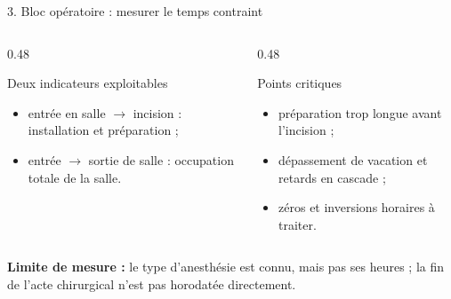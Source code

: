 \begin{frame}{3. Bloc opératoire : mesurer le temps contraint}
  \begin{center}
  \end{center}

  \vspace{0.2em}
  \begin{columns}[T]
    \begin{column}{0.48\textwidth}
      \begin{exampleblock}{Deux indicateurs exploitables}
        \footnotesize
        \begin{itemize}\itemsep1pt
          \item entrée en salle $\rightarrow$ incision : installation et préparation ;
          \item entrée $\rightarrow$ sortie de salle : occupation totale de la salle.
        \end{itemize}
      \end{exampleblock}
    \end{column}
    \begin{column}{0.48\textwidth}
      \begin{alertblock}{Points critiques}
        \footnotesize
        \begin{itemize}\itemsep1pt
          \item préparation trop longue avant l'incision ;
          \item dépassement de vacation et retards en cascade ;
          \item zéros et inversions horaires à traiter.
        \end{itemize}
      \end{alertblock}
    \end{column}
  \end{columns}

  \vspace{0.5em}
  {\footnotesize\textcolor{mcmPrimary}{\textbf{Limite de mesure :}}
  le type d'anesthésie est connu, mais pas ses heures ; la fin de l'acte
  chirurgical n'est pas horodatée directement.\par}
\end{frame}

